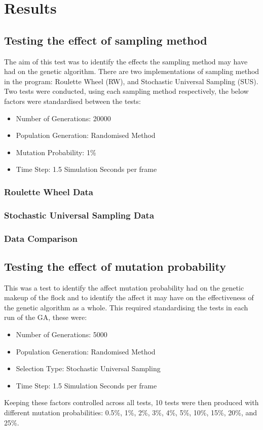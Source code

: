 \section{Results}

\subsection{Testing the effect of sampling method}
The aim of this test was to identify the effects the sampling method may have had on the genetic algorithm. There are two implementations of sampling method in the program: Roulette Wheel (RW), and Stochastic Universal Sampling (SUS).
Two tests were conducted, using each sampling method respectively, the below factors were standardised between the tests:
\begin{itemize}
\item Number of Generations: 20000
\item Population Generation: Randomised Method
\item Mutation Probability: 1\%
\item Time Step: 1.5 Simulation Seconds per frame
\end{itemize}

\subsubsection{Roulette Wheel Data}

\subsubsection{Stochastic Universal Sampling Data}

\subsubsection{Data Comparison}


\subsection{Testing the effect of mutation probability}
This was a test to identify the affect mutation probability had on the genetic makeup of the flock and to identify the affect it may have on the effectiveness of the genetic algorithm as a whole. This required standardising the tests in each run of the GA, these were:
\begin{itemize}
\item Number of Generations: 5000
\item Population Generation: Randomised Method
\item Selection Type: Stochastic Universal Sampling
\item Time Step: 1.5 Simulation Seconds per frame
\end{itemize}
Keeping these factors controlled across all tests, 10 tests were then produced with different mutation probabilities: 0.5\%, 1\%, 2\%, 3\%, 4\%, 5\%, 10\%, 15\%, 20\%, and 25\%.


